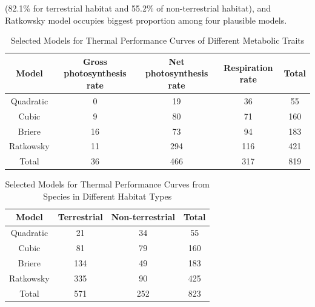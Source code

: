 \documentclass[11pt]{article}
\begin{document}
        (82.1\% for terrestrial habitat and 55.2\% of non-terrestrial habitat), and Ratkowsky model occupies biggest proportion 
        among four plausible models. 
        \begin{table}[H]
          \centering
          \caption{Selected Models for Thermal Performance Curves of Different Metabolic Traits}
          \begin{tabular}{@{}ccccc@{}}
          \toprule
          Model     & Gross photosynthesis rate & Net photosynthesis rate & Respiration rate  & Total \\ \midrule
          Quadratic & 0   & 19  & 36  & 55    \\
          Cubic     & 9   & 80  & 71  & 160   \\
          Briere    & 16  & 73  & 94  & 183   \\
          Ratkowsky & 11  & 294 & 116 & 421   \\
          Total     & 36  & 466 & 317 & 819   \\ \bottomrule
          \end{tabular}
          \end{table}
      
      
          \begin{table}[H]
            \centering
            \caption{Selected Models for Thermal Performance Curves from Species in Different Habitat Types}
            \begin{tabular}{@{}cccc@{}}
            \toprule
            Model     & Terrestrial & Non-terrestrial & Total \\ \midrule
            Quadratic & 21          & 34              & 55    \\
            Cubic     & 81          & 79              & 160   \\
            Briere    & 134         & 49              & 183   \\
            Ratkowsky & 335         & 90              & 425   \\
            Total     & 571         & 252             & 823   \\ \bottomrule
            \end{tabular}
            \end{table}
\end{document}

